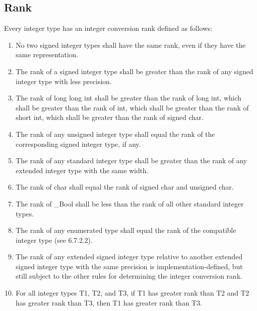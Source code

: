 \documentclass{article}
\begin{document}
\subsection{Rank}
Every integer type has an integer conversion rank defined as follows:
\begin{enumerate}[noitemsep]
    \item No two signed integer types shall have the same rank, even if they have the same representation.
    \item The rank of a signed integer type shall be greater than the rank of any signed integer
    type with less precision.
    \item The rank of long long int shall be greater than the rank of long int, which
    shall be greater than the rank of int, which shall be greater than the rank of short
    int, which shall be greater than the rank of signed char.
    \item The rank of any unsigned integer type shall equal the rank of the corresponding
    signed integer type, if any.
    \item The rank of any standard integer type shall be greater than the rank of any extended
    integer type with the same width.
    \item The rank of char shall equal the rank of signed char and unsigned char.
    \item The rank of \_Bool shall be less than the rank of all other standard integer types.
    \item The rank of any enumerated type shall equal the rank of the compatible integer type
    (see 6.7.2.2).
    \item The rank of any extended signed integer type relative to another extended signed
    integer type with the same precision is implementation-defined, but still subject to the
    other rules for determining the integer conversion rank.
    \item For all integer types T1, T2, and T3, if T1 has greater rank than T2 and T2 has
    greater rank than T3, then T1 has greater rank than T3.
\end{enumerate}
\end{document}

